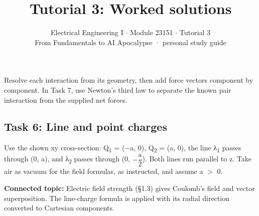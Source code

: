 \documentclass[11pt]{article}
\title{\sffamily\bfseries\color{FAUblue}Tutorial 3: Worked solutions}
\author{Electrical Engineering I \ensuremath{\cdot} Module 23151 \ensuremath{\cdot} Tutorial 3\\[2pt]\small From Fundamentals to AI Apocalypse · personal study guide}
\date{}
\begin{document}
\maketitle
\begingroup\footnotesize\setlength{\parskip}{0pt}\tableofcontents\endgroup
\clearpage

{\large Resolve each interaction from its geometry, then add force vectors component by component. In Task 7, use Newton’s third law to separate the known pair interaction from the supplied net forces.}


\begin{keepsection}
\section{Task 6: Line and point charges}

Use the shown xy cross-section: Q\textsubscript{1} = (\ensuremath{-}a, 0), Q\textsubscript{2} = (a, 0), the line λ\textsubscript{1} passes through (0, a), and λ\textsubscript{2} passes through (0, \ensuremath{-}{\small\ensuremath{\dfrac{\mathrm{a}}{2}}}). Both lines run parallel to z. Take air as vacuum for the field formulas, as instructed, and assume a \ensuremath{>} 0.

\textbf{Connected topic:} Electric field strength (§1.3) gives Coulomb’s field and vector superposition. The line-charge formula is applied with its radial direction converted to Cartesian components.


\end{keepsection}
\end{document}
